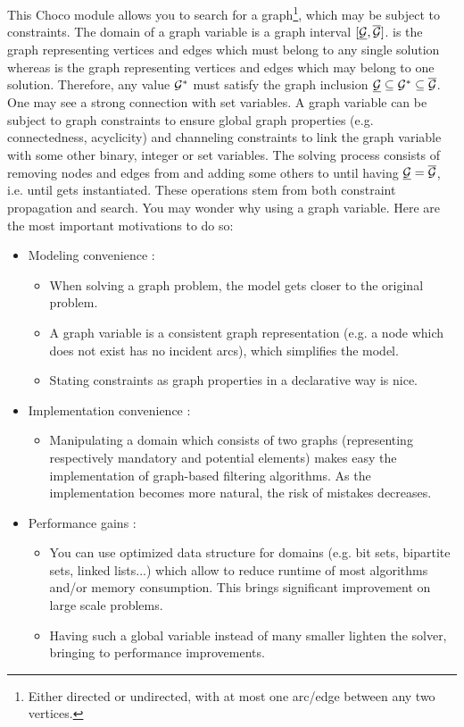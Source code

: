\documentclass{article}
\begin{document}
This Choco module allows you to search for a graph\footnote{Either directed or undirected, with at most one arc/edge between any two vertices. }, which may be subject to constraints. 
%
The domain of a graph variable \GV{} is a graph interval $[\underline{\mathcal{G}}{},\overline{\mathcal{G}}{}]$. \GLB{} is the graph representing vertices and edges which must belong to any single solution whereas \GUB{} is the graph representing vertices and edges which may belong to one solution. Therefore, any value $\mathcal{G}{}^*$ must satisfy the graph inclusion $\underline{\mathcal{G}}{} \subseteq \mathcal{G}{}^* \subseteq \overline{\mathcal{G}}{}$. One may see a strong connection with set variables.
%
A graph variable can be subject to graph constraints to ensure global graph properties (e.g. connectedness, acyclicity) and channeling constraints to link the graph variable with some other binary, integer or set variables. 
%
The solving process consists of removing nodes and edges from \GUB{} and adding some others to \GLB{} until having $\underline{\mathcal{G}}{} = \overline{\mathcal{G}}{}$, i.e. until \GV{} gets instantiated. These operations stem from both constraint propagation and search. You may wonder why using a graph variable. Here are the most important motivations to do so:
\begin{itemize}
\item Modeling convenience : 
\begin{itemize}
\item When solving a graph problem, the model gets closer to the original problem. 
\item A graph variable is a consistent graph representation (e.g. a node which does not exist has no incident arcs), which simplifies the model. 
\item Stating constraints as graph properties in a declarative way is nice. 
\end{itemize}
\item Implementation convenience : 
\begin{itemize}
\item Manipulating a domain which consists of two graphs (representing respectively mandatory and potential elements) makes easy the implementation of graph-based filtering algorithms. As the implementation becomes more natural, the risk of mistakes decreases.
\end{itemize}
\item Performance gains : 
\begin{itemize}
\item You can use optimized data structure for domains (e.g. bit sets, bipartite sets, linked lists...) which allow to reduce runtime of most algorithms and/or memory consumption. This brings significant improvement on large scale problems. 
\item Having such a global variable instead of many smaller lighten the solver, bringing to performance improvements.
\end{itemize}
\end{itemize}
\end{document}
